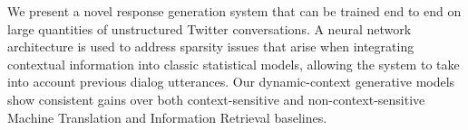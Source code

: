 We present a novel response generation system that can be trained end to end on large quantities of unstructured Twitter conversations.  A neural network architecture is used to address sparsity issues that arise when integrating contextual information into classic statistical models, allowing the system to take into account previous dialog utterances. Our dynamic-context generative models show consistent gains over both context-sensitive and non-context-sensitive Machine Translation and Information Retrieval baselines.

